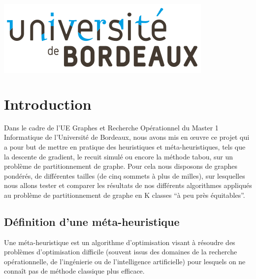 \documentclass[a4paper]{article}
\begin{document}
\begin{titlepage}

\includegraphics{img/logo.png}\\[1cm]
 

\vfill
\end{titlepage}

\tableofcontents

\newpage

\section{Introduction}
Dans le cadre de l'UE Graphes et Recherche Opérationnel du Master 1 Informatique de l'Université de Bordeaux, nous avons mis en œuvre ce projet qui a pour but de mettre en pratique des heuristiques et méta-heuristiques, tels que la descente de gradient, le recuit simulé ou encore la méthode tabou, sur un problème de partitionnement de graphe. Pour cela nous disposons de graphes pondérés, de différentes tailles (de cinq sommets à plus de milles), sur lesquelles nous allons tester et comparer les résultats de nos différents algorithmes appliqués au problème de partitionnement de graphe en K classes ``à peu près équitables''.

\subsection{Définition d'une méta-heuristique}
\begin{textit}
Une méta-heuristique est un algorithme d’optimisation visant à résoudre des problèmes d’optimisation difficile (souvent issus des domaines de la recherche opérationnelle, de l'ingénierie ou de l'intelligence artificielle) pour lesquels on ne connaît pas de méthode classique plus efficace.
\end{textit}
\end{document}
